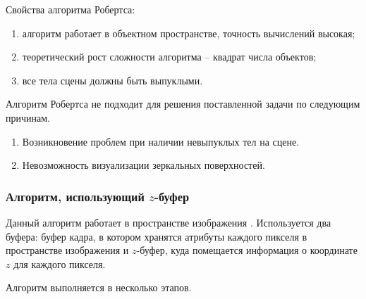 Свойства алгоритма Робертса:
\begin{enumerate}[label=\arabic*)]
	\item алгоритм работает в объектном пространстве, точность вычислений высокая;
	\item теоретический рост сложности алгоритма -- квадрат числа объектов;
	\item все тела сцены должны быть выпуклыми. 
\end{enumerate}

Алгоритм Робертса не подходит для решения поставленной задачи по следующим причинам.

\begin{enumerate}[label=\arabic*)]
	\item Возникновение проблем при наличии невыпуклых тел на сцене.
	\item Невозможность визуализации зеркальных поверхностей.
\end{enumerate}

\subsubsection{Алгоритм, использующий $z$-буфер}

Данный алгоритм работает в пространстве изображения \cite{rodgers}. Используется два буфера:
	буфер кадра, в котором хранятся атрибуты каждого пикселя в пространстве изображения и $z$-буфер, куда помещается информация о координате $z$ для каждого пикселя.

Алгоритм выполняется в несколько этапов.

